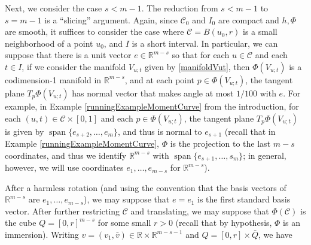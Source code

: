 \documentclass[letterpaper, reqno,11pt]{article}
\numberwithin{equation}{section}
\newcommand{\RR}{\mathbb{R}}
\numberwithin{thm}{section}
\theoremstyle{remark}
\begin{document}
Next, we consider the case $s<m-1$. The reduction from $s<m-1$ to $s=m-1$ is a ``slicing'' argument. Again, since $\mathcal{C}_0$ and $I_0$ are compact and $h,\Phi$ are smooth, it suffices to consider the case where $\mathcal{C}=B(u_0,r)$ is a small neighborhood of a point $u_0$, and $I$ is a short interval. In particular, we can suppose that there is a unit vector $e\in \RR^{m-s}$ so that for each $u\in \mathcal{C}$ and each $t\in I$, if we consider the manifold $V_{u;t}$ given by \eqref{manifoldVut},
then $\Phi(V_{u;t})$ is a codimension-1 manifold in $\RR^{m-s}$, and at each point $p\in \Phi(V_{u;t})$, the tangent plane $T_p \Phi(V_{u;t})$ has normal vector that makes angle at most $1/100$ with $e$. For example, in Example \ref{runningExampleMomentCurve} from the introduction, for each $(u,t)\in\mathcal{C}\times[0,1]$ and each $p\in \Phi(V_{u;t})$, the tangent plane $T_p \Phi(V_{u;t})$ is given by $\operatorname{span}\{e_{s+2},\ldots,e_m\}$, and thus is normal to $e_{s+1}$ (recall that in Example \ref{runningExampleMomentCurve}, $\Phi$ is the projection to the last $m-s$ coordinates, and thus we identify $\RR^{m-s}$ with $\operatorname{span}\{e_{s+1},\ldots,s_m\}$; in general, however, we will use coordinates $e_1,\ldots,e_{m-s}$ for $\RR^{m-s}$).

After a harmless rotation (and using the convention that the basis vectors of $\RR^{m-s}$ are $e_1,\ldots,e_{m-s}$), we may suppose that $e = e_1$ is the first standard basis vector. After further restricting $\mathcal{C}$ and translating, we may suppose that $\Phi(\mathcal{C})$ is the cube $Q=[0,r]^{m-s}$ for some small $r>0$ (recall that by hypothesis, $\Phi$ is an immersion). Writing $v = (v_1, \bar v)\in\RR\times \RR^{m-s-1}$ and $Q=[0,r]\times \bar Q$, we have 
\end{document}
